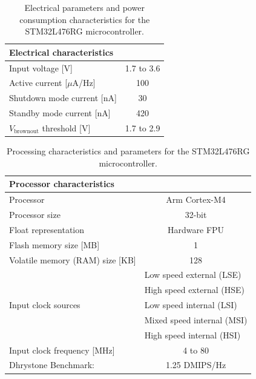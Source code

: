 \begin{table}[H]
	\centering
	\caption{Electrical parameters and power consumption characteristics for the STM32L476RG microcontroller. }
	\setlength{\extrarowheight}{5pt}
	\begin{tabular}{l  c}
		\hline
		\multicolumn{2}{l}{\textbf{Electrical characteristics}}\\
		\hline
		\hline
		Input voltage [V]    & 1.7 to 3.6\\
		\hline
		Active current [$\mu$A/Hz]    & 100 \\
		\hline
		Shutdown mode current [nA]  &  30 \\
		\hline
		Standby mode current [nA] &  420 \\
		\hline
		$V_{\text{brownout}}$ threshold [V] &  1.7 to 2.9\\
		\hline
		\hline
		
	\end{tabular}
	
	\label{tab:stm_specelec}
\end{table}
\begin{table}[H]
	\centering
	\caption{Processing characteristics and parameters for the STM32L476RG microcontroller. }
	\setlength{\extrarowheight}{5pt}
	\begin{tabular}{l  c}
		\hline
		\multicolumn{2}{l}{\textbf{Processor characteristics}}\\
		\hline
		\hline
		Processor   &  Arm Cortex-M4 \\
		\hline
		Processor size   & 32-bit\\
		\hline
		Float representation & Hardware FPU \\
		\hline
		Flash memory size [MB] & 1\\
		\hline
		Volatile memory (RAM) size [KB] & 128\\
		\hline
		\multirow{5}{*}{Input clock sources } & \multicolumn{1}{l}{Low speed external (LSE)}\\&  \multicolumn{1}{l}{High speed external (HSE)}\\ &  \multicolumn{1}{l}{Low speed internal (LSI)}\\ &  \multicolumn{1}{l}{Mixed speed internal (MSI)}\\ &  \multicolumn{1}{l}{High speed internal (HSI)} \\
		\hline
		Input clock frequency [MHz] & 4 to 80 \\
		\hline
		Dhrystone Benchmark: & 1.25 DMIPS/Hz \\
		\hline
		\hline
	\end{tabular}
	
	\label{tab:stm_specproc}
\end{table}

